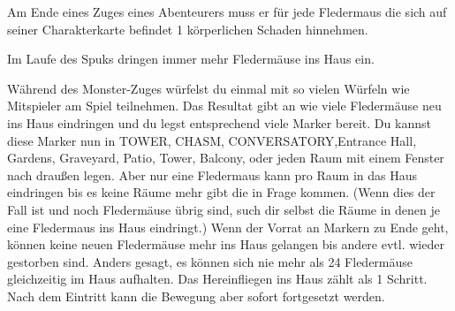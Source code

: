 





Am Ende eines Zuges eines Abenteurers muss er für jede Fledermaus die sich auf seiner Charakterkarte befindet 1 körperlichen Schaden hinnehmen.

\newpage



Im Laufe des Spuks dringen immer mehr Fledermäuse ins Haus ein.

  \begin{itemize}
    \bitem Während des Monster-Zuges würfelst du einmal mit so vielen Würfeln wie Mitspieler am Spiel teilnehmen. Das Resultat gibt an wie viele Fledermäuse neu ins Haus eindringen und du legst entsprechend viele Marker bereit.
    \bitem Du kannst diese Marker nun in TOWER, CHASM, CONVERSATORY,Entrance Hall, Gardens, Graveyard, Patio, Tower, Balcony,  oder jeden Raum mit einem Fenster nach draußen legen. Aber nur eine Fledermaus kann pro Raum in das Haus eindringen bis es keine Räume mehr gibt die in Frage kommen. (Wenn dies der Fall ist und noch Fledermäuse übrig sind, such dir selbst die Räume in denen je eine Fledermaus ins Haus eindringt.)
    \bitem Wenn der Vorrat an Markern zu Ende geht, können keine neuen Fledermäuse mehr ins Haus gelangen bis andere evtl. wieder gestorben sind. Anders gesagt, es können sich nie mehr als 24 Fledermäuse gleichzeitig im Haus aufhalten.
    \bitem Das Hereinfliegen ins Haus zählt als 1 Schritt. Nach dem Eintritt kann die Bewegung aber sofort fortgesetzt werden.

    \end{itemize}

